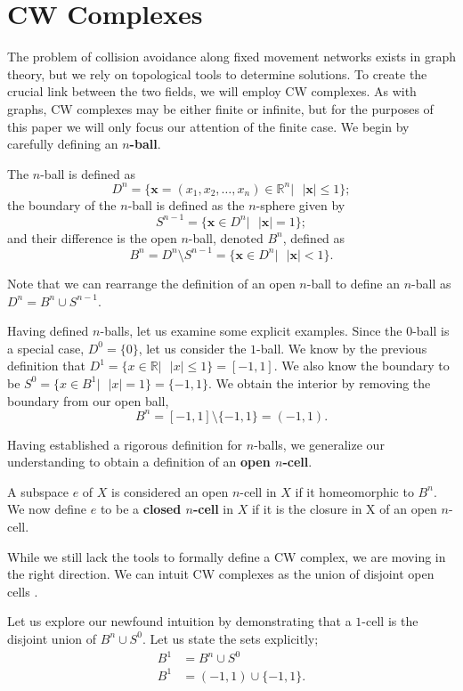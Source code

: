 \documentclass[12pt,oneside]{amsbook}
\newenvironment{defn}[1][Definition]{\begin{trivlist}
\item[\hskip \labelsep {\bfseries #1}]}{\end{trivlist}}
\newcommand{\R}{\mathbb{R}}
\newcommand{\n}{$n$}
\begin{document}
\section{CW Complexes}
The problem of collision avoidance along fixed movement networks exists in graph theory, but we rely on topological tools to determine solutions. To create the crucial link between the two fields, we will employ CW complexes. As with graphs, CW complexes may be either finite or infinite, but for the purposes of this paper we will only focus our attention of the finite case. We begin by carefully defining an \textbf{\n-ball}.

\begin{defn}
The $n$-ball is defined as $$D^n=\{\textbf{x}=(x_1,x_2,\dots, x_n)\in \R^n |\text{  } |\textbf{x}| \leq 1\};$$ the boundary of the \n-ball is defined as the \n-sphere given by $$ S^{n-1} = \{\textbf{x}\in D^n | \text{  } |\textbf{x}|=1\};$$ and their difference is the open \n-ball, denoted $B^n$, defined as $$B^n = D^n \setminus S^{n-1} = \{\textbf{x}\in D^n | \text{  } |\textbf{x}|< 1\}.$$ 
\end{defn}
Note that we can rearrange the definition of an open \n-ball to define an \n-ball as $D^n= B^n \cup S^{n-1}$. 

Having defined \n-balls, let us examine some explicit examples. Since the $0$-ball is a special case, $D^0=\{0\}$, let us consider the $1$-ball. We know by the previous definition that $D^1=\{x\in \R| \text{  } |x|\leq 1\} = [-1,1]$. We also know the boundary to be $S^0=\{x \in B^1| \text{  } |x|=1\} = \{-1,1\}$. We obtain the interior by removing the boundary from our open ball, $$B^n = [-1,1] \setminus \{-1,1\} = (-1,1).$$

Having established a rigorous definition for \n-balls, we generalize our understanding to obtain a definition of an \textbf{open \n-cell}.

\begin{defn}
A subspace $e$ of $X$ is considered an open \n-cell in $X$ if it homeomorphic to $B^n$. We now define $e$ to be a \textbf{closed \n-cell} in $X$ if it is the closure in X of an open \n-cell.
\end{defn}

While we still lack the tools to formally define a CW complex, we are moving in the right direction. We can intuit CW complexes as the union of disjoint open cells \cite{cw}.

Let us explore our newfound intuition by demonstrating that a $1$-cell is the disjoint union of $B^n \cup S^0$. Let us state the sets explicitly;
\begin{align*}
B^1 &= B^n \cup S^0\\
B^1 &= (-1,1) \cup \{-1,1\}.
\end{align*}
\end{document}

